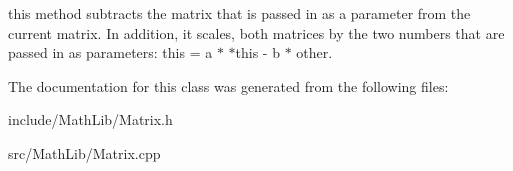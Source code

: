 \label{classCartWheel_1_1Math_1_1Matrix_a3e3cb8fbb2734f589230dc7914f7b586}
this method subtracts the matrix that is passed in as a parameter from the current matrix. In addition, it scales, both matrices by the two numbers that are passed in as parameters: this = a $\ast$ $\ast$this -\/ b $\ast$ other. 

The documentation for this class was generated from the following files:\begin{DoxyCompactItemize}
\item 
include/MathLib/Matrix.h\item 
src/MathLib/Matrix.cpp\end{DoxyCompactItemize}
